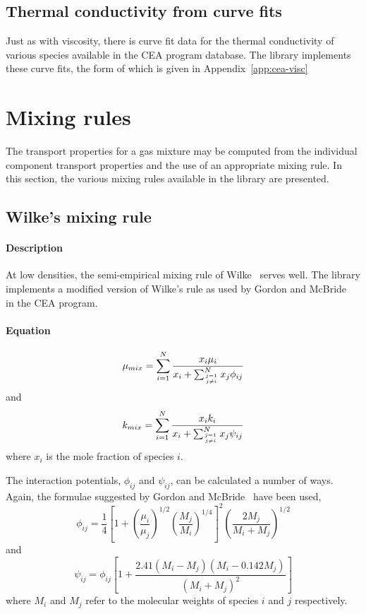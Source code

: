 \subsection{Thermal conductivity from curve fits}
Just as with viscosity, there is curve fit data for the thermal conductivity
of various species available in the CEA program database.
The library implements these curve fits, the form of which is
given in Appendix~\ref{app:cea-visc}

\section{Mixing rules}
The transport properties for a gas mixture may be computed from the individual
component transport properties and the use of an appropriate mixing rule.
In this section, the various mixing rules available in the library
are presented.

\subsection{Wilke's mixing rule}

\paragraph{Description}

At low densities, the semi-empirical mixing rule of Wilke~\cite{wilke_1950}
serves well.
The library implements a modified version of Wilke's rule as used
by Gordon and McBride~\cite{gordon_mcbride_1996} in the CEA program.

\paragraph{Equation}

\begin{equation}
   \mu_{mix} = \sum_{i=1}^N \frac{x_i \mu_i}{x_i + \sum_{\genfrac{}{}{0pt}{}{j=1}{j\neq i}}^N x_j \phi_{ij}}
\end{equation}
and
\begin{equation}
   k_{mix} = \sum_{i=1}^N \frac{x_i k_i}{x_i + \sum_{\genfrac{}{}{0pt}{}{j=1}{j\neq i}}^N x_j \psi_{ij}}
\end{equation}
where $x_i$ is the mole fraction of species $i$.

The interaction potentials, $\phi_{ij}$ and $\psi_{ij}$, can be calculated a number of ways.
Again, the formulae suggested by Gordon and McBride~\cite{gordon_mcbride_94} have been used,
\begin{equation}
   \phi_{ij} = \frac{1}{4} \left[ 1 + \left(\frac{\mu_i}{\mu_j}\right)^{1/2} 
               \left(\frac{M_j}{M_i}\right)^{1/4} \right]^2\left(\frac{2M_j}{M_i + M_j}\right)^{1/2}
\end{equation}
and
\begin{equation}
\psi_{ij} = \phi_{ij} \left[ 1 + \frac{2.41(M_i - M_j)(M_i - 0.142M_j)}{(M_i + M_j)^2}\right]
\end{equation}
where $M_i$ and $M_j$ refer to the molecular weights of species $i$ and $j$ respectively.

